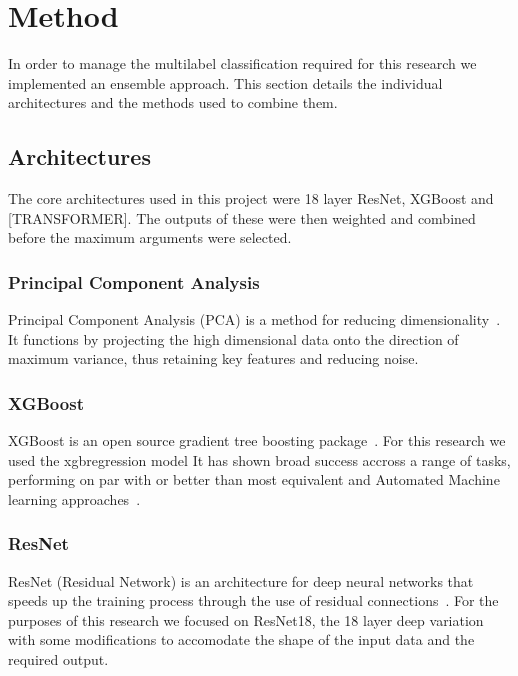\clearpage  %

\section{Method}

In order to manage the multilabel classification required for this research we implemented an ensemble approach.
This section details the individual architectures and the methods used to combine them.

\subsection{Architectures}

The core architectures used in this project were 18 layer ResNet, XGBoost and [TRANSFORMER]. The outputs of these were
then weighted and combined before the maximum arguments were selected.

\subsubsection{Principal Component Analysis}
Principal Component Analysis (PCA) is a method for reducing dimensionality~\cite{pcapaper}. It functions by projecting the high dimensional data onto the direction of maximum variance, thus retaining key features and reducing noise.



\subsubsection{XGBoost}
XGBoost is an open source gradient tree boosting package~\cite{xgboost}.
For this research we used the xgbregression model It has shown broad success accross a range of tasks, performing on par with or better than most equivalent and Automated Machine learning approaches~\cite{xgbcomp}.
\subsubsection{ResNet}
ResNet (Residual Network) is an architecture for deep neural networks that speeds up the training process through the use of residual connections~\cite{resnet}.
For the purposes of this research we focused on ResNet18, the 18 layer deep variation with some modifications to accomodate the shape of the input data and the required output.
